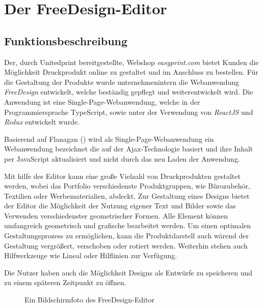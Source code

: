 \section{Der FreeDesign-Editor}
\label{Der FreeDesign-Editor}
\subsection{Funktionsbeschreibung}
Der, durch Unitedprint bereitgestellte, Webshop \emph{easyprint.com} bietet Kunden die Möglichkeit Druckprodukt online zu gestaltet und im Anschluss zu bestellen. Für die Gestaltung der Produkte wurde unternehmenintern die Webanwendung \emph{FreeDesign} entwickelt, welche beständig gepflegt und weiterentwickelt wird. Die Anwendung ist eine Single-Page-Webanwendung, welche in der Programmiersprache TypeScript, sowie unter der Verwendung von \emph{ReactJS} und \emph{Redux} entwickelt wurde. 

Basierend auf Flanagan (\citeyear[S. 497]{Flanagan2006}) wird als Single-Page-Webanwendung ein Webanwendung bezeichnet die auf der Ajax-Technologie basiert und ihre Inhalt per JavaScript aktualisiert und nicht durch das neu Laden der Anwendung. 

Mit hilfe des Editor kann eine große Vielzahl von Druckprodukten gestaltet werden, wobei das Portfolio verschiedenste Produktgruppen, wie Bürozubehör, Textilien oder Werbematerialien, abdeckt. Zur Gestaltung eines Designs bietet der Editor die Möglichkeit der Nutzung eigener Text und Bilder sowie das Verwenden verschiedenster geometrischer Formen. Alle Element können umfangreich geometrisch und grafische bearbeitet werden. Um einen optimalen Gestaltungsprozess zu ermöglichen, kann die Produktdarstell auch wärend der Gestaltung vergrößert, verschoben oder rotiert werden. Weiterhin stehen auch Hilfwerkzeuge wie Lineal oder Hilflinien zur Verfügung. 

Die Nutzer haben auch die Möglichkeit Designs als Entwürfe zu speicheren und zu einem späteren Zeitpunkt zu öffnen.

\begin{figure}[H]
    \centering
    \caption{Ein Bildschirmfoto des FreeDesign-Editor}
    \label{fig:Der FreeDesign-Editor}
\end{figure}

